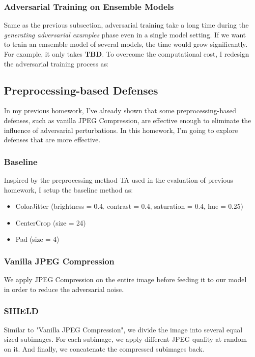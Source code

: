 \documentclass{article}
\begin{document}
\subsubsection{Adversarial Training on Ensemble Models}
Same as the previous subsection, adversarial training take a long time during the \textit{generating
adversarial examples} phase even in a single model setting. If we want to train an emsemble model of
several models, the time would grow significantly. For example, it only takes \textbf{TBD}. To
overcome the computational cost, I redesign the adversarial training process as:

\subsection{Preprocessing-based Defenses}
In my previous homework, I've already shown that some preprocessing-based defenses, such as vanilla
JPEG Compression, are effective enough to eliminate the influence of adversarial perturbations. In
this homework, I'm going to explore defenses that are more effective.

\subsubsection{Baseline}
Inspired by the preprocessing method TA used in the evaluation of previous homework, I setup the
baseline method as:

\begin{itemize}
  \item ColorJitter (brightness = 0.4, contrast = 0.4, saturation = 0.4, hue = 0.25)
  \item CenterCrop (size = 24)
  \item Pad (size = 4)
\end{itemize}

\subsubsection{Vanilla JPEG Compression}
We apply JPEG Compression on the entire image before feeding it to our model in order to reduce the
adversarial noise.

\subsubsection{SHIELD}
Similar to "Vanilla JPEG Compression", we divide the image into several equal sized subimages. For
each subimage, we apply different JPEG quality at random on it. And finally, we concatenate the
compressed subimages back.
\end{document}
